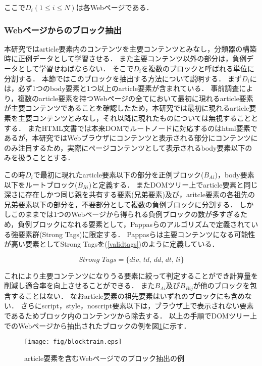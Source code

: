 \documentclass[a4paper,10pt,twocolumn]{jsarticle}
\begin{document}
ここで$D_i(1 \leq i \leq N)$は各Webページである．

\subsubsection{Webページからのブロック抽出}

本研究ではarticle要素内のコンテンツを主要コンテンツとみなし，分類器の構築時に正例データとして学習させる．
また主要コンテンツ以外の部分は，負例データとして学習せねばならない．
そこで$D_i$を複数のブロックと呼ばれる単位に分割する．
本節ではこのブロックを抽出する方法について説明する．
まず$D_i$には，必ず1つのbody要素と1つ以上のarticle要素が含まれている．
事前調査により，複数のarticle要素を持つWebページの全てにおいて最初に現れるarticle要素が主要コンテンツであることを確認したため，本研究では最初に現れるarticle要素を主要コンテンツとみなし，それ以降に現れたものについては無視することとする．
またHTML文書では本来DOMでルートノードに対応するのはhtml要素であるが，本研究ではWebブラウザにコンテンツと表示される部分にコンテンツにのみ注目するため，実際にページコンテンツとして表示されるbody要素以下のみを扱うこととする．

この時$D_i$で最初に現れたarticle要素以下の部分を正例ブロック($B_{Ai}$)，body要素以下をルートブロック($B_{Ri}$)と定義する．
またDOMツリー上でarticle要素と同じ深さに存在しかつ同じ親を共有する要素(兄弟要素)及び，aritcle要素の各祖先の兄弟要素以下の部分を，不要部分として複数の負例ブロックに分割する．
しかしこのままでは1つのWebページから得られる負例ブロックの数が多すぎるため，負例ブロックになれる要素として，Pappas\cite{pappas}らのアルゴリズムで定義されている強要素群(Strong Tags)に限定する．
Pappasらは主要コンテンツになる可能性が高い要素としてStrong Tagsを(\ref{validtags})のように定義している．

\begin{equation}
  \textit{Strong Tags} = \{\textit{div, td, dd, dt, li}\} \label{validtags}
\end{equation}

これにより主要コンテンツになりうる要素に絞って判定することができ計算量を削減し適合率を向上させることができる．
また$B_{Ai}$及び$B_{Bij}$が他のブロックを包含することはない．
なおarticle要素の祖先要素はいずれのブロックにも含めない．
さらにscript，style，noscript要素以下は，ブラウザ上で表示されない要素であるためブロック内のコンテンツから除去する．
以上の手順でDOMツリー上でのWebページから抽出されたブロックの例を図\ref{blocktrain}に示す．

\begin{figure}[th]
\vspace{2mm}
\begin{center}
\texttt{[image: fig/blocktrain.eps]}
\end{center}
\vspace{-6mm}
\caption{article要素を含むWebページでのブロック抽出の例}
\label{blocktrain}
\end{figure}
\end{document}

